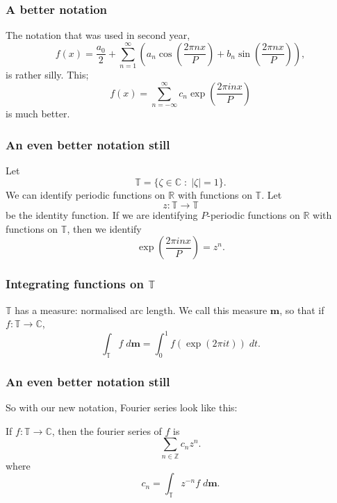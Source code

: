 \documentclass{beamer}
\newcommand{\Rl}{\mathbb{R}}
\newcommand{\Cplx}{\mathbb{C}}
\newcommand{\Circ}{\mathbb{T}}
\newcommand{\Itgr}{\mathbb{Z}}
\newcommand{\ha}{\boldsymbol{m}}
\begin{document}
\begin{frame}
    \frametitle{A better notation}
        The notation that was used in second year,
        \begin{equation*}
            f(x) = \frac{a_0}{2}+\sum_{n=1}^\infty \left(a_n \cos\left(\frac{2\pi n x}{P}\right)+b_n\sin\left(\frac{2\pi n x}{P}\right)\right),
        \end{equation*}
        is rather silly.
        This;
        \begin{equation*}
            f(x) = \sum_{n=-\infty}^\infty c_n \exp\left(\frac{2\pi in x}{P}\right)
        \end{equation*}
        is much better.
\end{frame}

\begin{frame}
    \frametitle{An even better notation still}
    Let
    \begin{equation*}
        \Circ = \{\zeta \in \Cplx\;:\;|\zeta|=1\}.
    \end{equation*}
    We can identify periodic functions on $\Rl$
    with functions on $\Circ$. 
    Let
    \begin{equation*}
        z:\Circ\rightarrow\Circ
    \end{equation*}
    be the identity function.
    If we are identifying $P$-periodic functions on $\Rl$
    with functions on $\Circ$, then we identify
    \begin{equation*}
        \exp\left(\frac{2\pi i n x}{P}\right) = z^n.
    \end{equation*}
\end{frame}

\begin{frame}
    \frametitle{Integrating functions on $\Circ$}
    $\Circ$ has a measure: normalised arc length.
    We call this measure $\ha$, so that
    if $f:\Circ\rightarrow\Cplx$,
    \begin{equation*}
        \int_\Circ f\;d\ha = \int_{0}^1 f\left(\exp(2\pi i t)\right)\;dt.
    \end{equation*}
\end{frame}

\begin{frame}
    \frametitle{An even better notation still}
    So with our new notation, Fourier series look like this:
    \begin{definition}
        If $f:\Circ\rightarrow \Cplx$, then the fourier series
        of $f$ is
        \begin{equation*}
            \sum_{n \in \Itgr} c_n z^n.
        \end{equation*}
        where
        \begin{equation*}
            c_n = \int_\Circ z^{-n} f\;d\ha.
        \end{equation*}
    \end{definition}
\end{frame}
\end{document}
